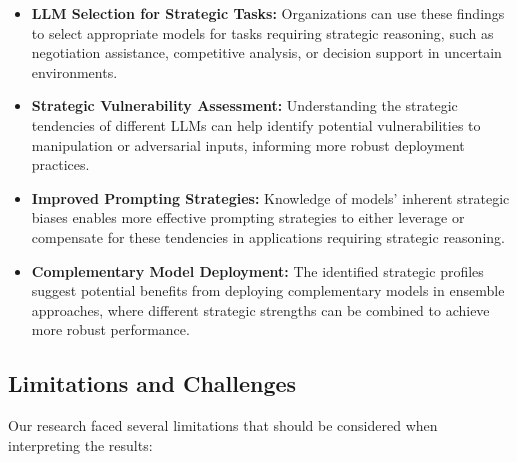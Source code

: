 \documentclass{article}
\begin{document}
\begin{itemize}
    \item \textbf{LLM Selection for Strategic Tasks:} Organizations can use these findings to select appropriate models for tasks requiring strategic reasoning, such as negotiation assistance, competitive analysis, or decision support in uncertain environments.
    
    \item \textbf{Strategic Vulnerability Assessment:} Understanding the strategic tendencies of different LLMs can help identify potential vulnerabilities to manipulation or adversarial inputs, informing more robust deployment practices.
    
    \item \textbf{Improved Prompting Strategies:} Knowledge of models' inherent strategic biases enables more effective prompting strategies to either leverage or compensate for these tendencies in applications requiring strategic reasoning.
    
    \item \textbf{Complementary Model Deployment:} The identified strategic profiles suggest potential benefits from deploying complementary models in ensemble approaches, where different strategic strengths can be combined to achieve more robust performance.
\end{itemize}

\subsection{Limitations and Challenges}
Our research faced several limitations that should be considered when interpreting the results:
\end{document}
